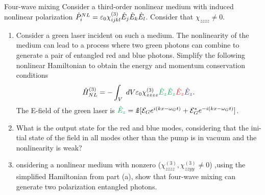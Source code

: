\begin{example}{Four-wave mixing}
    Consider a third-order nonlinear medium with induced nonlinear polarization $\hat{P}_i^{NL}=\varepsilon_0\chi_{ijkl}^{(3)}\hat{E}_j\hat{E}_k\hat{E}_l$.
    Consider that $\chi_{zzzz}\neq0$.
    \begin{enumerate}[itemsep=0pt,topsep=0pt,parsep=0pt,label=\alph*)]
        \item Consider a green laser incident on such a medium. The nonlinearity of the medium can lead to a process where two green photons can 
        combine to generate a pair of entangled red and blue photons. Simplify the following nonlinear Hamiltonian to obtain the energy and momentum 
        conservation conditions 
        \begin{align*}
            \hH_{NL}^{(3)}=-\int_V\;dV\varepsilon_0\chi_{zzzz}^{(3)}\textcolor{Green}{\hE_z}\textcolor{Green}{\hE_z}\textcolor{Red}{\hE_z}\textcolor{Blue}{\hE_z}.
        \end{align*}
        The E-field of the green laser is $\textcolor{Green}{\hE_z}=\hz[\E_Ge^{i(kx-\omega_Gt)}+\E^*_Ge^{-i(kx-\omega_Gt)}]$.
        \item What is the output state for the red and blue modes, considering that the ini-
        tial state of the field in all modes other than the pump is in vacuum and the
        nonlinearity is weak?
        \item onsidering a nonlinear medium with nonzero ($\chi_{zzzz}^{(3)},\chi_{zzyy}^{(3)}\neq0$) ,using the simplified Hamiltonian from part (a), show that four-wave mixing can
        generate two polarization entangled photons.
    \end{enumerate}

\end{example}
